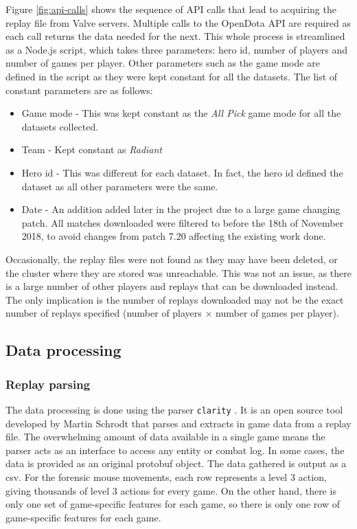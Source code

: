 \documentclass[Report.tex]{subfiles}
\begin{document}
Figure \ref{fig:api-calls} shows the sequence of API calls that lead to acquiring the replay file from Valve servers. Multiple calls to the OpenDota API are required as each call returns the data needed for the next. This whole process is streamlined as a Node.js script, which takes three parameters: hero id, number of players and number of games per player. Other parameters such as the game mode are defined in the script as they were kept constant for all the datasets. The list of constant parameters are as follows:
\begin{itemize}
\item Game mode - This was kept constant as the \textit{All Pick} game mode for all the datasets collected.
\item Team - Kept constant as \textit{Radiant}
\item Hero id - This was different for each dataset. In fact, the hero id defined the dataset as all other parameters were the same. 
\item Date - An addition added later in the project due to a large game changing patch. All matches downloaded were filtered to before the 18th of November 2018, to avoid changes from patch 7.20 affecting the existing work done. 
\end{itemize}
Occasionally, the replay files were not found as they may have been deleted, or the cluster where they are stored was unreachable. This was not an issue, as there is a large number of other players and replays that can be downloaded instead. The only implication is the number of replays downloaded may not be the exact number of replays specified (number of players $\times$ number of games per player).

\subsection{Data processing}

\subsubsection{Replay parsing}
The data processing is done using the parser \texttt{clarity} \cite{clarity}. It is an open source tool developed by Martin Schrodt that parses and extracts in game data from a replay file. The overwhelming amount of data available in a single game means the parser acts as an interface to access any entity or combat log. In some cases, the data is provided as an original protobuf object. The data gathered is output as a csv. For the forensic mouse movements, each row represents a level 3 action, giving thousands of level 3 actions for every game. On the other hand, there is only one set of game-specific features for each game, so there is only one row of game-specific features for each game.
\end{document}
